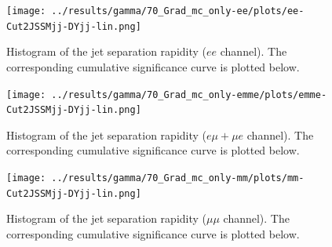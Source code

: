 \begin{figure}
	\centering
		\texttt{[image: ../results/gamma/70\_Grad\_mc\_only-ee/plots/ee-Cut2JSSMjj-DYjj-lin.png]}
		\caption{Histogram of the jet separation rapidity ($ee$ channel). The corresponding cumulative significance curve is plotted below.}
		\label{ee_DYjj}
\end{figure}
\begin{figure}
	\centering
		\texttt{[image: ../results/gamma/70\_Grad\_mc\_only-emme/plots/emme-Cut2JSSMjj-DYjj-lin.png]}
		\caption{Histogram of the jet separation rapidity ($e \mu + \mu e$ channel). The corresponding cumulative significance curve is plotted below.}
		\label{emme_DYjj}
\end{figure}
\begin{figure}
	\centering
		\texttt{[image: ../results/gamma/70\_Grad\_mc\_only-mm/plots/mm-Cut2JSSMjj-DYjj-lin.png]}
		\caption{Histogram of the jet separation rapidity ($\mu\mu$ channel). The corresponding cumulative significance curve is plotted below.}
		\label{mm_DYjj}
\end{figure}
